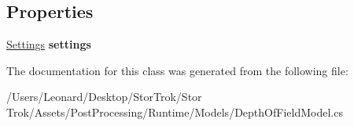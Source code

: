 \subsection*{Properties}
\begin{DoxyCompactItemize}
\item 
\mbox{\label{class_unity_engine_1_1_post_processing_1_1_depth_of_field_model_aa547c7750456651d57d3d4c2bfb91409}} 
\hyperlink{struct_unity_engine_1_1_post_processing_1_1_depth_of_field_model_1_1_settings}{Settings} {\bfseries settings}
\end{DoxyCompactItemize}


The documentation for this class was generated from the following file\+:\begin{DoxyCompactItemize}
\item 
/\+Users/\+Leonard/\+Desktop/\+Stor\+Trok/\+Stor Trok/\+Assets/\+Post\+Processing/\+Runtime/\+Models/Depth\+Of\+Field\+Model.\+cs\end{DoxyCompactItemize}
